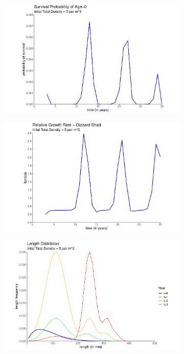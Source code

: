 \documentclass[11pt,oneside]{amsart}
\theoremstyle{definition}
\begin{document}
\begin{figure}
\centering
\begin{subfigure}[b]{.3\textwidth}
  \includegraphics[width=\textwidth]{figures/Figure5a.pdf}
   \caption{}
  \label{}
\end{subfigure}
\begin{subfigure}[b]{.3\textwidth}
   \includegraphics[width=\textwidth]{figures/Figure5b.pdf}
     \caption{}
\label{}
\end{subfigure}
\begin{subfigure}[b]{.3\textwidth}
   \includegraphics[width=\textwidth]{figures/Figure5c.pdf}

\end{subfigure}
\end{figure}
\end{document}
